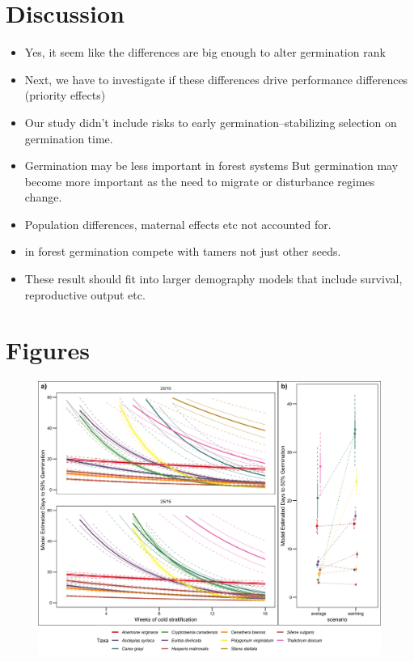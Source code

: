 \documentclass[11pt]{article}\usepackage[]{graphicx}\usepackage[]{color}
\begin{document}
\section*{Discussion}
\begin{itemize}
\item Yes, it seem like the differences are big enough to alter germination rank
\item Next, we have to investigate if these differences drive performance differences (priority effects)
\item Our study didn't include risks to early germination--stabilizing selection on germination time.
\item Germination may be less important in forest systems But germination may become more important as the need to migrate or disturbance regimes change.
\item Population differences, maternal effects etc not accounted for.
\item in forest germination compete with tamers not just other seeds.
\item These result should fit into larger demography models that include survival, reproductive output etc.
\end{itemize}
 
\section*{Figures}
\begin{figure}[h!]
    \centering
 \includegraphics[width=\textwidth]{..//figures/AFTplots.jpeg} 
    \caption{} 
    \label{fig:AFT}
\end{figure}
\end{document}
